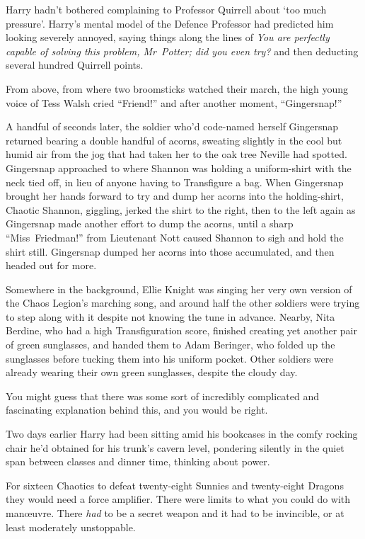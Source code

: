 Harry hadn’t bothered complaining to Professor Quirrell about ‘too much pressure’. Harry’s mental model of the Defence Professor had predicted him looking severely annoyed, saying things along the lines of \emph{You are perfectly capable of solving this problem, Mr~Potter; did you even try?} and then deducting several hundred Quirrell points.

From above, from where two broomsticks watched their march, the high young voice of Tess Walsh cried “Friend!” and after another moment, “Gingersnap!”

A handful of seconds later, the soldier who’d code-named herself Gingersnap returned bearing a double handful of acorns, sweating slightly in the cool but humid air from the jog that had taken her to the oak tree Neville had spotted. Gingersnap approached to where Shannon was holding a uniform-shirt with the neck tied off, in lieu of anyone having to Transfigure a bag. When Gingersnap brought her hands forward to try and dump her acorns into the holding-shirt, Chaotic Shannon, giggling, jerked the shirt to the right, then to the left again as Gingersnap made another effort to dump the acorns, until a sharp “Miss~Friedman!” from Lieutenant Nott caused Shannon to sigh and hold the shirt still. Gingersnap dumped her acorns into those accumulated, and then headed out for more.

Somewhere in the background, Ellie Knight was singing her very own version of the Chaos Legion’s marching song, and around half the other soldiers were trying to step along with it despite not knowing the tune in advance. Nearby, Nita Berdine, who had a high Transfiguration score, finished creating yet another pair of green sunglasses, and handed them to Adam Beringer, who folded up the sunglasses before tucking them into his uniform pocket. Other soldiers were already wearing their own green sunglasses, despite the cloudy day.

You might guess that there was some sort of incredibly complicated and fascinating explanation behind this, and you would be right.

Two days earlier Harry had been sitting amid his bookcases in the comfy rocking chair he’d obtained for his trunk’s cavern level, pondering silently in the quiet span between classes and dinner time, thinking about power.

For sixteen Chaotics to defeat twenty-eight Sunnies and twenty-eight Dragons they would need a force amplifier. There were limits to what you could do with manœuvre. There \emph{had} to be a secret weapon and it had to be invincible, or at least moderately unstoppable.

